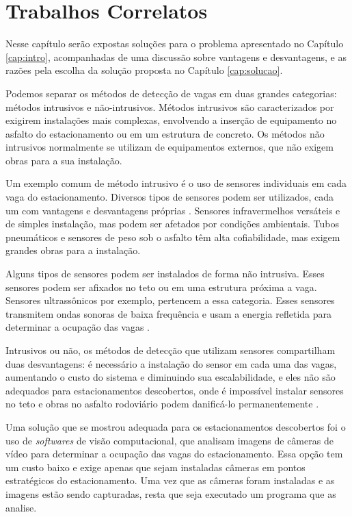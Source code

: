 \section{Trabalhos Correlatos} \label{cap:trabalhos}

Nesse capítulo serão expostas soluções para o problema apresentado no Capítulo \ref{cap:intro}, acompanhadas de uma discussão sobre vantagens e desvantagens, e as razões pela escolha da solução proposta no Capítulo \ref{cap:solucao}.

Podemos separar os métodos de detecção de vagas em duas grandes categorias: métodos intrusivos e não-intrusivos. Métodos intrusivos são caracterizados por exigirem instalações mais complexas, envolvendo a inserção de equipamento no asfalto do estacionamento ou em um estrutura de concreto. Os métodos não intrusivos normalmente se utilizam de equipamentos externos, que não exigem obras para a sua instalação.

Um exemplo comum de método intrusivo é o uso de sensores individuais em cada vaga do estacionamento. Diversos tipos de sensores podem ser utilizados, cada um com vantagens e desvantagens próprias \cite{idris09}. Sensores infravermelhos versáteis e de simples instalação, mas podem ser afetados por condições ambientais. Tubos pneumáticos e sensores de peso sob o asfalto têm alta cofiabilidade, mas exigem grandes obras para a instalação. 

Alguns tipos de sensores podem ser instalados de forma não intrusiva. Esses sensores podem ser afixados no teto ou em uma estrutura próxima a vaga. Sensores ultrassônicos por exemplo, pertencem a essa categoria. Esses sensores transmitem ondas sonoras de baixa frequência e usam a energia refletida para determinar a ocupação das vagas \cite{kianpisheh2012smart}.

Intrusivos ou não, os métodos de detecção que utilizam sensores compartilham duas desvantagens: é necessário a instalação do sensor em cada uma das vagas, aumentando o custo do sistema e diminuindo sua escalabilidade, e eles não são adequados para estacionamentos descobertos, onde é impossível instalar sensores no teto e obras no asfalto rodoviário podem danificá-lo permanentemente \cite{idris09}.

Uma solução que se mostrou adequada para os estacionamentos descobertos foi o uso de \textit{softwares} de visão computacional, que analisam imagens de câmeras de vídeo para determinar a ocupação das vagas do estacionamento. Essa opção tem um custo baixo e exige apenas que sejam instaladas câmeras em pontos estratégicos do estacionamento. Uma vez que as câmeras foram instaladas e as imagens estão sendo capturadas, resta que seja executado um programa que as analise.

